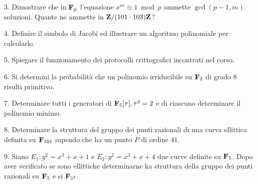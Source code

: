 \item{3.} Dimostrare che in ${\bf F}_p$ l'equazione $x^m\equiv1\bmod p$ 
          ammette $\gcd(p-1,m)$ soluzioni. Quante ne ammette in ${\bf Z}/(101\cdot 103){\bf Z}$?\vv

\item{4.} Definire il simbolo di Jacobi ed illustrare un algoritmo polinomiale per calcolarlo.\vv

\item{5.} Spiegare il funzionamento dei protocolli crittografici incontrati nel corso.\ve\vs

\item{6.} Si determini la probabilit\`a che un polinomio irriducibile 
          su ${\bf F}_2$ di grado $8$ risulti primitivo.\vv

\item{7.} Determinare tutti i generatori di ${\bf F}_{5}[\tau], \tau^2=2$ e di ciascuno determinare il polinomio minimo.\ve \vs

\item{8.} Determinare la struttura del gruppo dei punti razionali di una curva ellittica definita su ${\bf F}_{101}$ sapendo che
ha un punto $P$ di ordine $41$.\vv\vv

\item{9.} Siano $E_1: y^2=x^3+x+1$ e $E_2: y^2=x^3+x+4$ due curve definite su ${\bf F}_5$. Dopo aver verificato se sono ellittiche determinarne ka struttura della
          gruppo dei punti razionali su ${\bf F}_5$ e si ${\bf F}_{5^2}$.
 
\ \vst\bye

